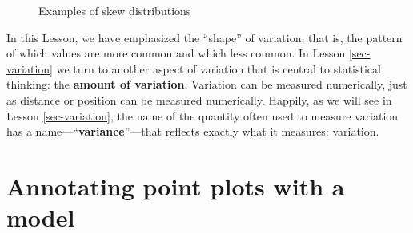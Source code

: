 \documentclass[
  letterpaper,
  DIV=11,
  numbers=noendperiod,
  oneside]{scrartcl}
\begin{document}
\begin{tcolorbox}
\begin{figure}[H]
\begin{minipage}{0.50\linewidth}
{}


\end{minipage}%
%
\begin{minipage}{0.50\linewidth}



\end{minipage}%

\caption{\label{fig-extreme-storm-fires}Examples of skew distributions}

\end{figure}%

\end{tcolorbox}

In this Lesson, we have emphasized the ``shape'' of variation, that is,
the pattern of which values are more common and which less common. In
Lesson \ref{sec-variation} we turn to another aspect of variation that
is central to statistical thinking: the \textbf{amount of variation}.
Variation can be measured numerically, just as distance or position can
be measured numerically. Happily, as we will see in Lesson
\ref{sec-variation}, the name of the quantity often used to measure
variation has a name---``\textbf{variance}''---that reflects exactly
what it measures: variation.

\newpage

\section{Annotating point plots with a
model}\label{sec-model-annotation}
\end{document}
